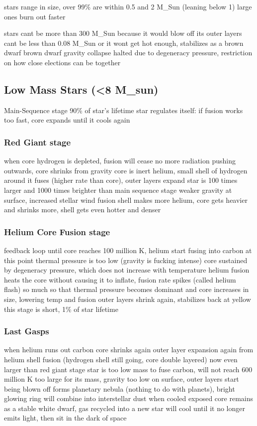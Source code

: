 stars range in size, over 99\% are within 0.5 and 2 M\_Sun (leaning below 1)
large ones burn out faster

stars cant be more than 300 M\_Sun because it would blow off its outer layers
cant be less than 0.08 M\_Sun or it wont get hot enough, stabilizes as a brown dwarf
brown dwarf gravity collapse halted due to degeneracy pressure, restriction on how close elections can be together

\subsection{Low Mass Stars (<8 M\_sun)}
    Main-Sequence stage
        90\% of star's lifetime
        star regulates itself: if fusion works too fast, core expands until it cools again

    \subsubsection{Red Giant stage}
        when core hydrogen is depleted, fusion will cease
        no more radiation pushing outwards, core shrinks from gravity
        core is inert helium, small shell of hydrogen around it fuses (higher rate than core), outer layers expand
        star is 100 times larger and 1000 times brighter than main sequence stage
        weaker gravity at surface, increased stellar wind
        fusion shell makes more helium, core gets heavier and shrinks more, shell gets even hotter and denser

    \subsubsection{Helium Core Fusion stage}
        feedback loop until core reaches 100 million K, helium start fusing into carbon
        at this point thermal pressure is too low (gravity is fucking intense)
        core sustained by degeneracy pressure, which does not increase with temperature
        helium fusion heats the core without causing it to inflate, fusion rate spikes (called helium flash)
        so much so that thermal pressure becomes dominant and core increases in size, lowering temp and fusion
        outer layers shrink again, stabilizes back at yellow
        this stage is short, 1\% of star lifetime

    \subsubsection{Last Gasps}
        when helium runs out carbon core shrinks again
        outer layer expansion again from helium shell fusion (hydrogen shell still going, core double layered)
        now even larger than red giant stage
        star is too low mass to fuse carbon, will not reach 600 million K
        too large  for its mass, gravity too low on surface, outer layers start being blown off
        forms planetary nebula (nothing to do with planets), bright glowing ring
        will combine into interstellar dust when cooled
        exposed core remains as a stable white dwarf, gas recycled into a new star
        will cool until it no longer emits light, then sit in the dark of space


